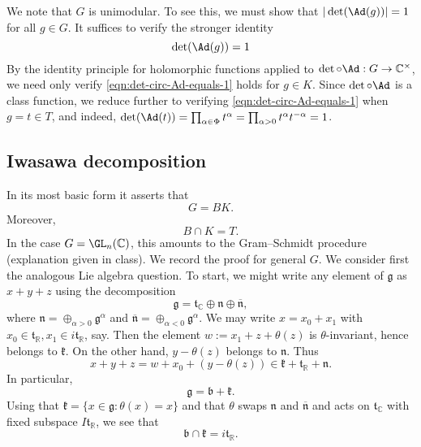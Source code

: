 \documentclass[reqno]{amsart} 
\begin{document}
We note that $G$ is unimodular.  To see this, we must show that $|\det(\Ad(g))| = 1$ for all $g \in G$.  It suffices to verify the stronger identity
\begin{equation}\label{eqn:det-circ-Ad-equals-1}
  \det(\Ad(g)) = 1
\end{equation}
By the identity principle for holomorphic functions applied to $\det \circ \Ad : G \rightarrow \mathbb{C}^\times$, we need only verify \eqref{eqn:det-circ-Ad-equals-1} holds for $g \in K$.  Since $\det \circ \Ad$ is a class function, we reduce further to verifying \eqref{eqn:det-circ-Ad-equals-1} when $g = t \in T$, and indeed, $\det(\Ad(t)) = \prod_{\alpha \in \Phi} t^\alpha = \prod_{\alpha > 0} t^{\alpha} t^{-\alpha} = 1$.

\subsection{Iwasawa decomposition} \label{sec:iwas-decomp}
In its most basic form it asserts that
\begin{equation*}
  G = B  K.
\end{equation*}
Moreover,
\begin{equation*}
  B \cap K = T.
\end{equation*}
In the case $G = \GL_n(\mathbb{C})$, this amounts to the Gram--Schmidt procedure (explanation given in class).  We record the proof for general $G$.  We consider first the analogous Lie algebra question.  To start, we might write any element of $\mathfrak{g}$ as $x + y + z$ using the decomposition
\begin{equation*}
  \mathfrak{g} = \mathfrak{t}_{\mathbb{C}} \oplus \mathfrak{n} \oplus \overline{\mathfrak{n}},
\end{equation*}
where $\mathfrak{n} = \oplus_{\alpha > 0} \mathfrak{g}^\alpha$ and $\overline{ \mathfrak{n} } = \oplus_{\alpha < 0} \mathfrak{g}^\alpha$.  We may write $x = x_0 + x_1$ with $x_0 \in \mathfrak{t}_{\mathbb{R}}, x_1 \in i \mathfrak{t}_{\mathbb{R}}$, say.  Then the element $w := x_1 + z + \theta (z)$ is $\theta$-invariant, hence belongs to $\mathfrak{k}$.  On the other hand, $y - \theta(z)$ belongs to $\mathfrak{n}$.  Thus
\begin{equation*}
  x + y + z = w + x_0 + (y - \theta(z)) \in \mathfrak{k} + \mathfrak{t}_{\mathbb{R}} + \mathfrak{n} .
\end{equation*}
In particular,
\begin{equation}\label{eqn:Lie-alg-iwasawa}
  \mathfrak{g} =
  \mathfrak{b} + \mathfrak{k}.
\end{equation}
Using that $\mathfrak{k} = \{x \in \mathfrak{g} : \theta(x) = x\}$ and that $\theta$ swaps $\mathfrak{n}$ and $\overline{\mathfrak{n}}$ and acts on $\mathfrak{t}_{\mathbb{C}}$ with fixed subspace $I \mathfrak{t}_{\mathbb{R}}$, we see that
\begin{equation*}
  \mathfrak{b} \cap \mathfrak{k} = i \mathfrak{t}_{\mathbb{R}}.
\end{equation*}
\end{document}
